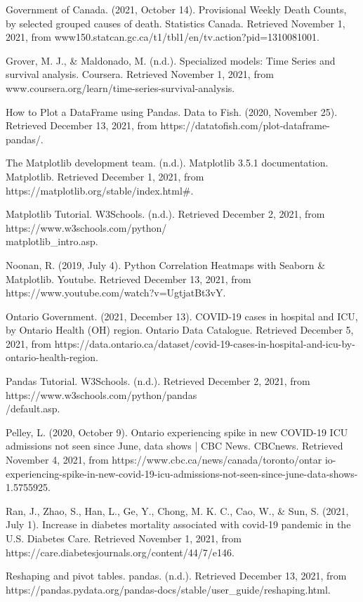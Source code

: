 \documentclass[fontsize=11pt]{article}
\begin{document}
\noindent
Government of Canada. (2021, October 14). Provisional Weekly Death Counts, by selected grouped causes of death. Statistics Canada. Retrieved November 1, 2021, from www150.statcan.gc.ca/t1/tbl1/en/tv.action?pid=1310081001.


\noindent
Grover, M. J., \& Maldonado, M. (n.d.). Specialized models: Time Series and survival analysis. Coursera. Retrieved November 1, 2021, from www.coursera.org/learn/time-series-survival-analysis.


\noindent
How to Plot a DataFrame using Pandas. Data to Fish. (2020, November 25). Retrieved December 13, 2021, from https://datatofish.com/plot-dataframe-pandas/.

\noindent
The Matplotlib development team. (n.d.). Matplotlib 3.5.1 documentation. Matplotlib. Retrieved December 1, 2021, from https://matplotlib.org/stable/index.html\#. 

\noindent
Matplotlib Tutorial. W3Schools. (n.d.). Retrieved December 2, 2021, from https://www.w3schools.com/python/ \\
matplotlib\_intro.asp. 

\noindent
Noonan, R. (2019, July 4). Python Correlation Heatmaps with Seaborn \& Matplotlib. Youtube. Retrieved December 13, 2021, from https://www.youtube.com/watch?v=UgtjatBt3vY.

\noindent
Ontario Government. (2021, December 13). COVID-19 cases in hospital and ICU, by Ontario Health (OH) region. Ontario Data Catalogue. Retrieved December 5, 2021, from https://data.ontario.ca/dataset/covid-19-cases-in-hospital-and-icu-by-ontario-health-region.

\noindent
Pandas Tutorial. W3Schools. (n.d.). Retrieved December 2, 2021, from https://www.w3schools.com/python/pandas \\
/default.asp. 


\noindent
Pelley, L. (2020, October 9). Ontario experiencing spike in new COVID-19 ICU admissions not seen since June, data shows | CBC News. CBCnews. Retrieved November 4, 2021, from https://www.cbc.ca/news/canada/toronto/ontar
io-experiencing-spike-in-new-covid-19-icu-admissions-not-seen-since-june-data-shows-1.5755925.

\noindent
Ran, J., Zhao, S., Han, L., Ge, Y., Chong, M. K. C., Cao, W., \& Sun, S. (2021, July 1). Increase in diabetes mortality associated with covid-19 pandemic in the U.S. Diabetes Care. Retrieved November 1, 2021, from https://care.diabetesjournals.org/content/44/7/e146.

\noindent
Reshaping and pivot tables. pandas. (n.d.). Retrieved December 13, 2021, from https://pandas.pydata.org/pandas-docs/stable/user\_guide/reshaping.html. 
\end{document}
